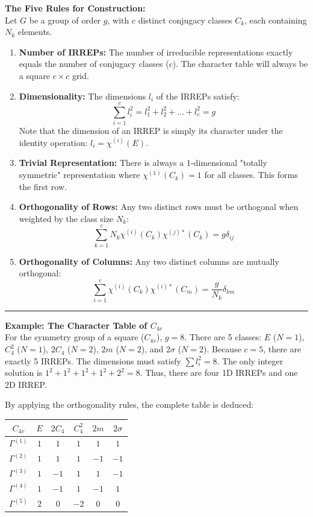 \documentclass[11pt, a4paper]{report}
\begin{document}
\textbf{The Five Rules for Construction:}\\
Let $G$ be a group of order $g$, with $c$ distinct conjugacy classes $C_k$, each containing $N_k$ elements.
\begin{enumerate}
    \item \textbf{Number of IRREPs:} The number of irreducible representations exactly equals the number of conjugacy classes ($c$). The character table will always be a square $c \times c$ grid.
    \item \textbf{Dimensionality:} The dimensions $l_i$ of the IRREPs satisfy:
    \[ \sum_{i=1}^c l_i^2 = l_1^2 + l_2^2 + \dots + l_c^2 = g \]
    Note that the dimension of an IRREP is simply its character under the identity operation: $l_i = \chi^{(i)}(E)$.
    \item \textbf{Trivial Representation:} There is always a 1-dimensional "totally symmetric" representation where $\chi^{(1)}(C_k) = 1$ for all classes. This forms the first row.
    \item \textbf{Orthogonality of Rows:} Any two distinct rows must be orthogonal when weighted by the class size $N_k$:
    \[ \sum_{k=1}^c N_k \chi^{(i)}(C_k) \chi^{(j)*}(C_k) = g \delta_{ij} \]
    \item \textbf{Orthogonality of Columns:} Any two distinct columns are mutually orthogonal:
    \[ \sum_{i=1}^c \chi^{(i)}(C_k) \chi^{(i)*}(C_m) = \frac{g}{N_k} \delta_{km} \]
\end{enumerate}

\vspace{1em}
\hrule
\vspace{1em}

\textbf{Example: The Character Table of $C_{4v}$}\\
For the symmetry group of a square ($C_{4v}$), $g=8$. There are 5 classes: $E$ ($N=1$), $C_4^2$ ($N=1$), $2C_4$ ($N=2$), $2m$ ($N=2$), and $2\sigma$ ($N=2$).
Because $c=5$, there are exactly 5 IRREPs. The dimensions must satisfy $\sum l_i^2 = 8$. The only integer solution is $1^2 + 1^2 + 1^2 + 1^2 + 2^2 = 8$. Thus, there are four 1D IRREPs and one 2D IRREP.

By applying the orthogonality rules, the complete table is deduced:
\begin{center}
\renewcommand{\arraystretch}{1.5}
\begin{tabular}{c|ccccc}
$C_{4v}$ & $E$ & $2C_4$ & $C_4^2$ & $2m$ & $2\sigma$ \\
\hline
$\Gamma^{(1)}$ & $1$ & $1$ & $1$ & $1$ & $1$ \\
$\Gamma^{(2)}$ & $1$ & $1$ & $1$ & $-1$ & $-1$ \\
$\Gamma^{(3)}$ & $1$ & $-1$ & $1$ & $1$ & $-1$ \\
$\Gamma^{(4)}$ & $1$ & $-1$ & $1$ & $-1$ & $1$ \\
$\Gamma^{(5)}$ & $2$ & $0$ & $-2$ & $0$ & $0$ \\
\end{tabular}
\end{center}
\end{document}
